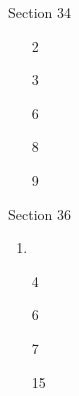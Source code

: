 







Section 34

 \begin{enumerate}

   \item[2] 
   \pagebreak
   \item[3] 
   \pagebreak
   \item[6] 
   \pagebreak
   \item[8] 
   \pagebreak
   \item[9] 
   \pagebreak

 \end{enumerate}

Section 36 

 \begin{enumerate}

   \item 
   \pagebreak
   \item[4] 
   \pagebreak
   \item[6] 
   \pagebreak
   \item[7] 
   \pagebreak
   \item[15] 

 \end{enumerate}


